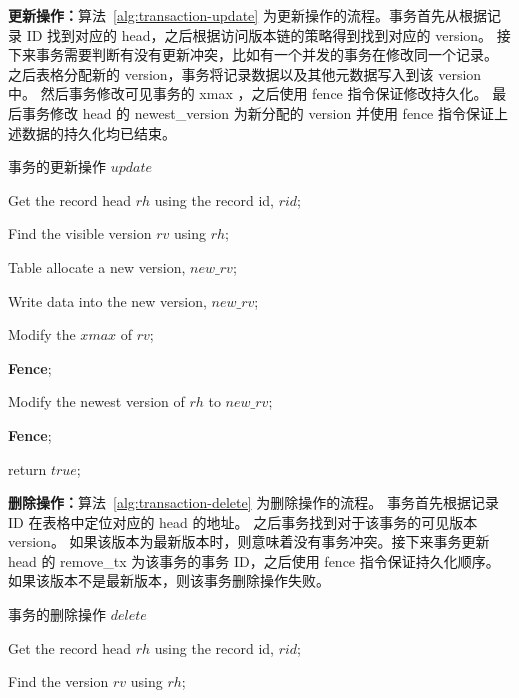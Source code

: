 \textbf{更新操作：}算法~\ref{alg:transaction-update} 为更新操作的流程。事务首先从根据记录 ID 找到对应的 head，之后根据访问版本链的策略得到找到对应的 version。
接下来事务需要判断有没有更新冲突，比如有一个并发的事务在修改同一个记录。
之后表格分配新的 version，事务将记录数据以及其他元数据写入到该 version 中。
然后事务修改可见事务的 xmax ，之后使用 fence 指令保证修改持久化。
最后事务修改 head 的 newest\_version 为新分配的 version 并使用 fence 指令保证上述数据的持久化均已结束。

\begin{algorithm}[h]
    \caption{事务的更新操作 $update$}
    \label{alg:transaction-update}
    \BlankLine
    Get the record head $rh$ using the record id, $rid$;

    Find the visible version $rv$ using $rh$;


    Table allocate a new version, $new\_rv$;

    Write data into the new version, $new\_rv$;

    Modify the $xmax$ of $rv$;

    \textbf{Fence};

    Modify the newest version of $rh$ to $new\_rv$;

    \textbf{Fence};

    return $true$;

\end{algorithm}


\textbf{删除操作：}算法~\ref{alg:transaction-delete} 为删除操作的流程。
事务首先根据记录 ID 在表格中定位对应的 head 的地址。
之后事务找到对于该事务的可见版本 version。
如果该版本为最新版本时，则意味着没有事务冲突。接下来事务更新 head 的 remove\_tx 为该事务的事务 ID，之后使用 fence 指令保证持久化顺序。
如果该版本不是最新版本，则该事务删除操作失败。

\begin{algorithm}[h]
    \caption{事务的删除操作 $delete$}
    \label{alg:transaction-delete}
    \BlankLine
    Get the record head $rh$ using the record id, $rid$;

    Find the version $rv$ using $rh$;


\end{algorithm}

